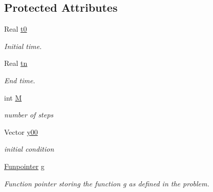 \subsection*{Protected Attributes}
\begin{DoxyCompactItemize}
\item 
\mbox{\label{class_o_d_e___system_a1947b357608babc98c5e79d645e24c3c}} 
Real \mbox{\hyperlink{class_o_d_e___system_a1947b357608babc98c5e79d645e24c3c}{t0}}
\begin{DoxyCompactList}\small\item\em Initial time. \end{DoxyCompactList}\item 
\mbox{\label{class_o_d_e___system_a5c5a0dd9f04dfb8d8a84d49b741773af}} 
Real \mbox{\hyperlink{class_o_d_e___system_a5c5a0dd9f04dfb8d8a84d49b741773af}{tn}}
\begin{DoxyCompactList}\small\item\em End time. \end{DoxyCompactList}\item 
\mbox{\label{class_o_d_e___system_a46e5ee402ffc7c500dccad753a1fba36}} 
int \mbox{\hyperlink{class_o_d_e___system_a46e5ee402ffc7c500dccad753a1fba36}{M}}
\begin{DoxyCompactList}\small\item\em number of steps \end{DoxyCompactList}\item 
\mbox{\label{class_o_d_e___system_a1379137a4480e5861fd1911bc061f908}} 
Vector \mbox{\hyperlink{class_o_d_e___system_a1379137a4480e5861fd1911bc061f908}{y00}}
\begin{DoxyCompactList}\small\item\em initial condition \end{DoxyCompactList}\item 
\mbox{\label{class_o_d_e___system_a2dee2a4b3468547c3ddab15edfc8ddfd}} 
\mbox{\hyperlink{class_o_d_e___system_a9ff6775dafbba78d49f164174aa7074e}{Funpointer}} \mbox{\hyperlink{class_o_d_e___system_a2dee2a4b3468547c3ddab15edfc8ddfd}{g}}
\begin{DoxyCompactList}\small\item\em Function pointer storing the function g as defined in the problem. \end{DoxyCompactList}\item 

\end{DoxyCompactItemize}
